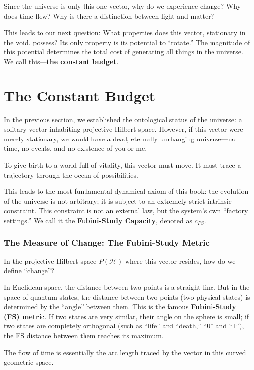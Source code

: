 Since the universe is only this one vector, why do we experience change? Why does time flow? Why is there a distinction between light and matter?

This leads to our next question: What properties does this vector, stationary in the void, possess? Its only property is its potential to ``rotate.'' The magnitude of this potential determines the total cost of generating all things in the universe. We call this---\textbf{the constant budget}.

\section{The Constant Budget}

In the previous section, we established the ontological status of the universe: a solitary vector inhabiting projective Hilbert space. However, if this vector were merely stationary, we would have a dead, eternally unchanging universe---no time, no events, and no existence of you or me.

To give birth to a world full of vitality, this vector must move. It must trace a trajectory through the ocean of possibilities.

This leads to the most fundamental dynamical axiom of this book: the evolution of the universe is not arbitrary; it is subject to an extremely strict intrinsic constraint. This constraint is not an external law, but the system's own ``factory settings.'' We call it the \textbf{Fubini-Study Capacity}, denoted as \textbf{$c_{FS}$}.

\subsubsection{The Measure of Change: The Fubini-Study Metric}

In the projective Hilbert space $P(\mathcal{H})$ where this vector resides, how do we define ``change''?

In Euclidean space, the distance between two points is a straight line. But in the space of quantum states, the distance between two points (two physical states) is determined by the ``angle'' between them. This is the famous \textbf{Fubini-Study (FS) metric}. If two states are very similar, their angle on the sphere is small; if two states are completely orthogonal (such as ``life'' and ``death,'' ``0'' and ``1''), the FS distance between them reaches its maximum.

The flow of time is essentially the arc length traced by the vector in this curved geometric space.

